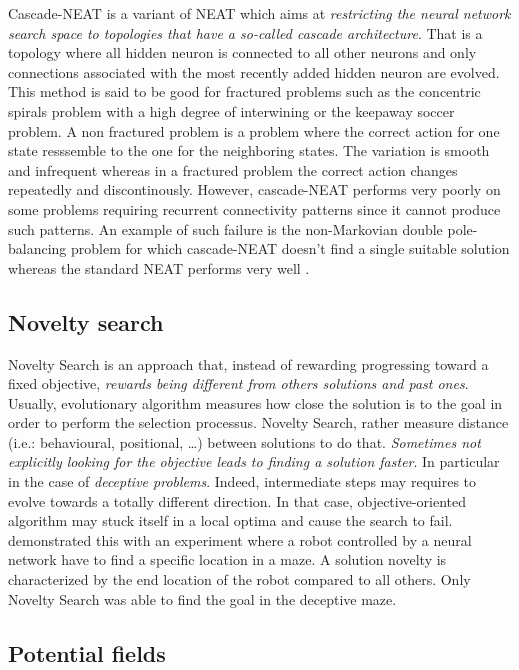 Cascade-NEAT is a variant of NEAT which aims at \emph{restricting the neural network
search space to topologies that have a so-called cascade architecture}. That is
a topology where all hidden neuron is connected to all other neurons and
only connections associated with the most recently added hidden neuron are evolved.
This method is said to be good for fractured problems such as the concentric spirals
problem with a high degree of interwining or the keepaway soccer problem.
A non fractured problem is a problem where the correct action for one state
resssemble to the one for the neighboring states. The variation is smooth
and infrequent whereas in a fractured problem the correct action changes
repeatedly and discontinously.
However, cascade-NEAT performs very poorly on some problems requiring recurrent
connectivity patterns since it cannot produce such patterns. An example of
such failure is the non-Markovian double pole-balancing problem for which
cascade-NEAT doesn't find a single suitable solution whereas the standard NEAT
performs very well \cite{KoAS09} \cite{KoMi09}.

\subsection{Novelty search}\label{subsec:novelty-search}

Novelty Search is an approach that, instead of rewarding progressing toward a
fixed objective, \emph{rewards being different from others solutions and past ones}.
Usually, evolutionary algorithm measures how close the solution is to the goal
in order to perform the selection processus. Novelty Search, rather measure
distance (i.e.: behavioural, positional, …) between solutions to do that.
\emph{Sometimes not explicitly looking for the objective
leads to finding a solution faster}.
In particular in the case of \emph{deceptive problems}. Indeed, intermediate steps
may requires to evolve towards a totally different direction.
In that case, objective-oriented algorithm may stuck itself
in a local optima and cause the search to fail.
\citet{LeSt11} demonstrated this with an experiment where a robot controlled by a
neural network have to find a specific location in a maze.
A solution novelty is characterized by the end location of the robot
compared to all others. Only Novelty Search was able
to find the goal in the deceptive maze.

\subsection{Potential fields}\label{subsec:potential-fields}


